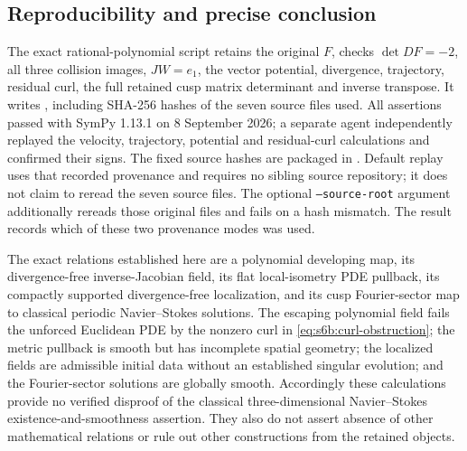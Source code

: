\subsection{Reproducibility and precise conclusion}
The exact rational-polynomial script
 retains the original $F$,
checks $\det DF=-2$, all three collision images, $JW=e_1$, the vector
potential, divergence, trajectory, residual curl, the full retained cusp
matrix determinant and inverse transpose.  It writes
, including SHA-256
hashes of the seven source files used.  All assertions passed with
SymPy 1.13.1 on 8 September 2026; a separate agent independently replayed
the velocity, trajectory, potential and residual-curl calculations and
confirmed their signs.
The fixed source hashes are packaged in
.
Default replay uses that recorded provenance and requires no sibling source
repository; it does not claim to reread the seven source files.
The optional \texttt{--source-root} argument additionally rereads those
original files and fails on a hash mismatch.  The result records which
of these two provenance modes was used.

The exact relations established here are a polynomial developing map,
its divergence-free inverse-Jacobian field, its flat local-isometry PDE
pullback, its compactly supported divergence-free localization, and its
cusp Fourier-sector map to classical periodic Navier--Stokes solutions.
The escaping polynomial field fails the unforced Euclidean PDE by the
nonzero curl in \eqref{eq:s6b:curl-obstruction}; the metric pullback is
smooth but has incomplete spatial geometry; the localized fields are
admissible initial data without an established singular evolution; and
the Fourier-sector solutions are globally smooth.  Accordingly these
calculations provide no verified disproof of the classical
three-dimensional Navier--Stokes existence-and-smoothness assertion.
They also do not assert absence of other mathematical relations or rule
out other constructions from the retained objects.
